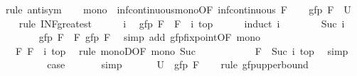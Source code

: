 \begin{isabellebody}
\ {\isacharparenleft}rule\ antisym{\isacharparenright}\isanewline
\ \ \isamarkupfalse%
\ mono\ {\isacharequal}\ inf{\isacharunderscore}continuous{\isacharunderscore}mono{\isacharbrackleft}OF\ {\isacartoucheopen}inf{\isacharunderscore}continuous\ F{\isacartoucheclose}{\isacharbrackright}\isanewline
\ \ \isamarkupfalse%
\ {\isachardoublequoteopen}gfp\ F\ {\isasymle}\ {\isacharquery}U{\isachardoublequoteclose}\isanewline
\ \ \isamarkupfalse%
\ {\isacharparenleft}rule\ INF{\isacharunderscore}greatest{\isacharparenright}\isanewline
\ \ \ \ \isamarkupfalse%
\ i\ \isamarkupfalse%
\ {\isachardoublequoteopen}gfp\ F\ {\isasymle}\ {\isacharparenleft}F\ {\isacharcircum}{\isacharcircum}\ i{\isacharparenright}\ top{\isachardoublequoteclose}\isanewline
\ \ \ \ \isamarkupfalse%
\ {\isacharparenleft}induct\ i{\isacharparenright}\isanewline
\ \ \ \ \ \ \isamarkupfalse%
\ {\isacharparenleft}Suc\ i{\isacharparenright}\isanewline
\ \ \ \ \ \ \isamarkupfalse%
\ {\isachardoublequoteopen}gfp\ F\ {\isacharequal}\ F\ {\isacharparenleft}gfp\ F{\isacharparenright}{\isachardoublequoteclose}\ \isamarkupfalse%
\ {\isacharparenleft}simp\ add{\isacharcolon}\ gfp{\isacharunderscore}fixpoint{\isacharbrackleft}OF\ mono{\isacharbrackright}{\isacharparenright}\isanewline
\ \ \ \ \ \ \isamarkupfalse%
\ \isamarkupfalse%
\ {\isachardoublequoteopen}{\isasymdots}\ {\isasymle}\ F\ {\isacharparenleft}{\isacharparenleft}F\ {\isacharcircum}{\isacharcircum}\ i{\isacharparenright}\ top{\isacharparenright}{\isachardoublequoteclose}\ \isamarkupfalse%
\ {\isacharparenleft}rule\ monoD{\isacharbrackleft}OF\ mono\ Suc{\isacharbrackright}{\isacharparenright}\isanewline
\ \ \ \ \ \ \isamarkupfalse%
\ \isamarkupfalse%
\ {\isachardoublequoteopen}{\isasymdots}\ {\isacharequal}\ {\isacharparenleft}F\ {\isacharcircum}{\isacharcircum}\ Suc\ i{\isacharparenright}\ top{\isachardoublequoteclose}\ \isamarkupfalse%
\ simp\isanewline
\ \ \ \ \ \ \isamarkupfalse%
\ \isamarkupfalse%
\ {\isacharquery}case\ \isacommand{{\isachardot}}\isamarkupfalse%
\isanewline
\ \ \ \ \isamarkupfalse%
\ simp\isanewline
\ \ \isamarkupfalse%
\isanewline
\ \ \isamarkupfalse%
\ {\isachardoublequoteopen}{\isacharquery}U\ {\isasymle}\ gfp\ F{\isachardoublequoteclose}\isanewline
\ \ \isamarkupfalse%
\ {\isacharparenleft}rule\ gfp{\isacharunderscore}upperbound{\isacharparenright}\isanewline

\end{isabellebody}
